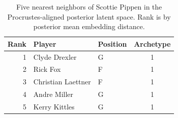 \begin{table}[htbp]
  \centering\small
  \begin{tabular}{rllc}
    \toprule
    Rank & Player & Position & Archetype \\
    \midrule
    1 & Clyde Drexler & G & 1 \\
    2 & Rick Fox & F & 1 \\
    3 & Christian Laettner & F & 1 \\
    4 & Andre Miller & G & 1 \\
    5 & Kerry Kittles & G & 1 \\
    \bottomrule
  \end{tabular}
  \caption{Five nearest neighbors of Scottie Pippen in the Procrustes-aligned posterior latent space. Rank is by posterior mean embedding distance.}
  \label{tab:Scottie_Pippen_neighbors}
\end{table}

